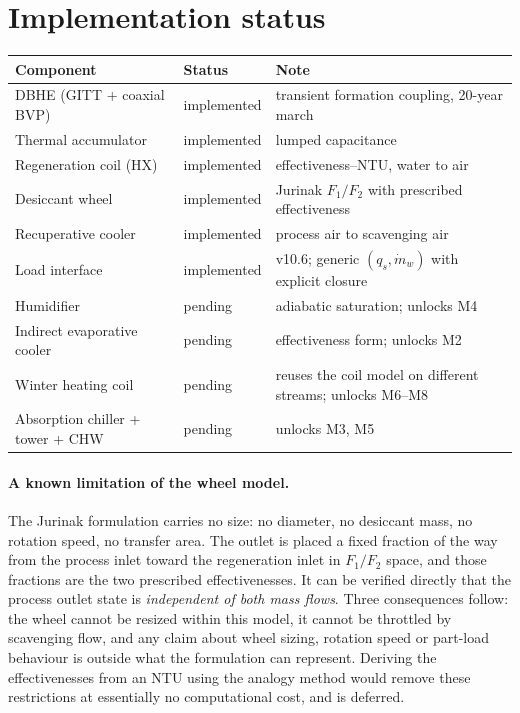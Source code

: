\documentclass[11pt]{article}
\newcommand{\mdw}{\ensuremath{\dot m_{w}}}
\newcommand{\qs}{\ensuremath{q_{s}}}
\begin{document}
\section{Implementation status}\label{sec:status}

\begin{longtable}{@{}llp{}@{}}
\toprule
\textbf{Component} & \textbf{Status} & \textbf{Note} \\
\midrule
\endhead
DBHE (GITT + coaxial BVP) & implemented & transient formation coupling, 20-year march \\
Thermal accumulator & implemented & lumped capacitance \\
Regeneration coil (HX) & implemented & effectiveness--NTU, water to air \\
Desiccant wheel & implemented & Jurinak $F_1/F_2$ with prescribed effectiveness \\
Recuperative cooler & implemented & process air to scavenging air \\
Load interface & implemented & v10.6; generic $(\qs, \mdw)$ with explicit closure \\
Humidifier & pending & adiabatic saturation; unlocks M4 \\
Indirect evaporative cooler & pending & effectiveness form; unlocks M2 \\
Winter heating coil & pending & reuses the coil model on different streams; unlocks M6--M8 \\
Absorption chiller + tower + CHW & pending & unlocks M3, M5 \\
\bottomrule
\end{longtable}

\paragraph{A known limitation of the wheel model.} The Jurinak formulation
carries no size: no diameter, no desiccant mass, no rotation speed, no
transfer area. The outlet is placed a fixed fraction of the way from the
process inlet toward the regeneration inlet in $F_1/F_2$ space, and those
fractions are the two prescribed effectivenesses. It can be verified directly
that the process outlet state is \emph{independent of both mass flows}. Three
consequences follow: the wheel cannot be resized within this model, it cannot
be throttled by scavenging flow, and any claim about wheel sizing, rotation
speed or part-load behaviour is outside what the formulation can represent.
Deriving the effectivenesses from an NTU using the analogy method would remove
these restrictions at essentially no computational cost, and is deferred.
\end{document}
